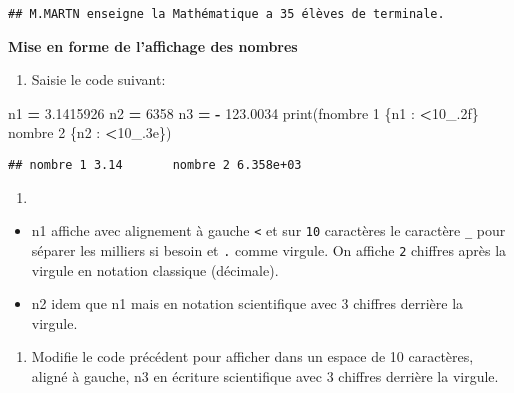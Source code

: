 \documentclass[
]{book}
\newenvironment{Shaded}{\begin{snugshade}}{\end{snugshade}}
\newcommand{\BuiltInTok}[1]{#1}
\newcommand{\DecValTok}[1]{\textcolor[rgb]{0.00,0.00,0.81}{#1}}
\newcommand{\FloatTok}[1]{\textcolor[rgb]{0.00,0.00,0.81}{#1}}
\newcommand{\NormalTok}[1]{#1}
\newcommand{\OperatorTok}[1]{\textcolor[rgb]{0.81,0.36,0.00}{\textbf{#1}}}
\newcommand{\SpecialCharTok}[1]{\textcolor[rgb]{0.00,0.00,0.00}{#1}}
\newcommand{\SpecialStringTok}[1]{\textcolor[rgb]{0.31,0.60,0.02}{#1}}
\providecommand{\tightlist}{%
  \setlength{\itemsep}{0pt}\setlength{\parskip}{0pt}}
\def\tightlist{}
\begin{document}
\begin{verbatim}
## M.MARTN enseigne la Mathématique a 35 élèves de terminale.
\end{verbatim}

\textbf{Mise en forme de l'affichage des nombres}

\begin{enumerate}
\def\labelenumi{\arabic{enumi}.}
\tightlist
\item
  Saisie le code suivant:
\end{enumerate}

\begin{Shaded}
\begin{Highlighting}[]
\NormalTok{n1 }\OperatorTok{=} \FloatTok{3.1415926} 
\NormalTok{n2 }\OperatorTok{=} \DecValTok{6358}
\NormalTok{n3 }\OperatorTok{=} \OperatorTok{{-}} \FloatTok{123.0034}
\BuiltInTok{print}\NormalTok{(}\SpecialStringTok{f\textquotesingle{}nombre 1 }\SpecialCharTok{\{n1} \SpecialCharTok{:} \OperatorTok{\textless{}}\DecValTok{10}\SpecialCharTok{\_}\FloatTok{.2}\SpecialCharTok{f\}}\SpecialStringTok{ nombre 2 }\SpecialCharTok{\{n2} \SpecialCharTok{:} \OperatorTok{\textless{}}\DecValTok{10}\SpecialCharTok{\_}\FloatTok{.3}\SpecialCharTok{e\}}\SpecialStringTok{\textquotesingle{}}\NormalTok{) }
\end{Highlighting}
\end{Shaded}

\begin{verbatim}
## nombre 1 3.14       nombre 2 6.358e+03
\end{verbatim}

\begin{enumerate}
\def\labelenumi{\arabic{enumi}.}
\setcounter{enumi}{1}
\tightlist
\item
\end{enumerate}

\begin{itemize}
\tightlist
\item
  n1 affiche avec alignement à gauche \texttt{\textless{}} et sur \texttt{10} caractères le caractère \texttt{\_} pour séparer les milliers si besoin et \texttt{.} comme virgule. On affiche \texttt{2} chiffres après la virgule en notation classique (décimale).
\item
  n2 idem que n1 mais en notation scientifique avec 3 chiffres derrière la virgule.
\end{itemize}

\begin{enumerate}
\def\labelenumi{\arabic{enumi}.}
\setcounter{enumi}{2}
\tightlist
\item
  Modifie le code précédent pour afficher dans un espace de 10 caractères, aligné à gauche, n3 en écriture scientifique avec 3 chiffres derrière la virgule.
\end{enumerate}
\end{document}

